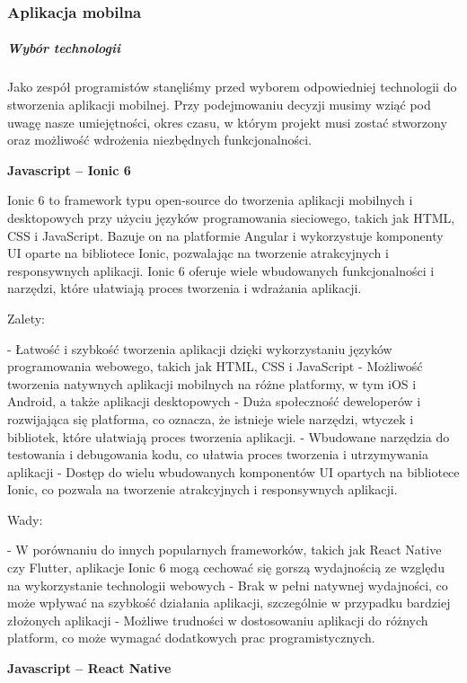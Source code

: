 \documentclass[12pt, a4paper, twoside, openany]{book}
\begin{document}

\subsubsection{Aplikacja mobilna}

\subparagraph{Wybór technologii}
Jako zespół programistów stanęliśmy przed wyborem odpowiedniej technologii do stworzenia aplikacji mobilnej. Przy podejmowaniu decyzji musimy wziąć pod uwagę nasze umiejętności, okres czasu, w którym projekt musi zostać stworzony oraz możliwość wdrożenia niezbędnych funkcjonalności.

\textbf{Javascript -- Ionic 6\\}

Ionic 6 to framework typu open-source do tworzenia aplikacji mobilnych i desktopowych przy użyciu języków programowania sieciowego, takich jak HTML, CSS i JavaScript. Bazuje on na platformie Angular i wykorzystuje komponenty UI oparte na bibliotece Ionic, pozwalając na tworzenie atrakcyjnych i responsywnych aplikacji. Ionic 6 oferuje wiele wbudowanych funkcjonalności i narzędzi, które ułatwiają proces tworzenia i wdrażania aplikacji.
    
Zalety:

- Łatwość i szybkość tworzenia aplikacji dzięki wykorzystaniu języków programowania webowego, takich jak HTML, CSS i JavaScript
- Możliwość tworzenia natywnych aplikacji mobilnych na różne platformy, w tym iOS i Android, a także aplikacji desktopowych
- Duża społeczność deweloperów i rozwijająca się platforma, co oznacza, że istnieje wiele narzędzi, wtyczek i bibliotek, które ułatwiają proces tworzenia aplikacji.
- Wbudowane narzędzia do testowania i debugowania kodu, co ułatwia proces tworzenia i utrzymywania aplikacji
- Dostęp do wielu wbudowanych komponentów UI opartych na bibliotece Ionic, co pozwala na tworzenie atrakcyjnych i responsywnych aplikacji.

Wady:

- W porównaniu do innych popularnych frameworków, takich jak React Native czy Flutter, aplikacje Ionic 6 mogą cechować się gorszą wydajnością ze względu na wykorzystanie technologii webowych
- Brak w pełni natywnej wydajności, co może wpływać na szybkość działania aplikacji, szczególnie w przypadku bardziej złożonych aplikacji
- Możliwe trudności w dostosowaniu aplikacji do różnych platform, co może wymagać dodatkowych prac programistycznych.

\textbf{Javascript -- React Native\\}
\end{document}
